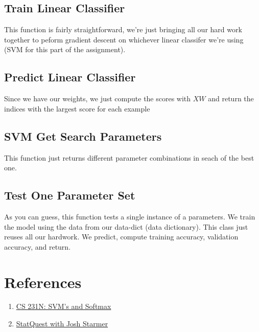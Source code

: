 \documentclass[12pt]{article}
\begin{document}
\subsection{Train Linear Classifier}
This function is fairly straightforward, we're just bringing all our hard work together 
to peform gradient descent on whichever linear classifer we're using (SVM for this 
part of the assignment). 

\subsection{Predict Linear Classifier}
Since we have our weights, we just compute the scores with $XW$ and return the indices
with the largest score for each example

\subsection{SVM Get Search Parameters}
This function just returns different parameter combinations in seach of the best one. 

\subsection{Test One Parameter Set}
As you can guess, this function tests a single instance of a parameters. We train the model 
using the data from our data-dict (data dictionary). This class just reuses all our hardwork. 
We predict, compute training accuracy, validation accuracy, and return. 



\section{References}
\begin{enumerate}
    \item \href{https://cs231n.github.io/linear-classify/#svm-vs-softmax}{CS 231N: SVM's and Softmax }
    \item \href{https://www.youtube.com/watch?v=efR1C6CvhmE}{StatQuest with Josh Starmer}
\end{enumerate}
\end{document}
